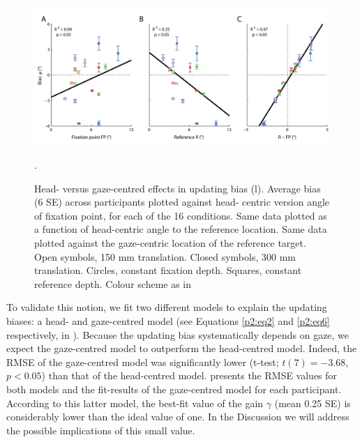 \begin{figure}
    \includegraphics[width=1.0\textwidth]{src/paper2/figure4.pdf}

    \caption{Head- versus gaze-centred effects in updating bias (l).  Average bias (6 SE) across participants plotted against head- centric version angle of fixation point, for each of the 16 conditions.  Same data plotted as a function of head-centric angle to the reference location.  Same data plotted against the gaze-centric location of the reference target. Open symbols, 150 mm translation. Closed symbols, 300 mm translation. Circles, constant fixation depth. Squares, constant reference depth. Colour scheme as in }.

    \label{p2:fig4}
\end{figure}

To validate this notion, we fit two different models to explain the updating biases: a head- and gaze-centred model (see Equations \ref{p2:eq2} and \ref{p2:eq6} respectively, in ). Because the updating bias systematically depends on gaze, we expect the gaze-centred model to outperform the head-centred model. Indeed, the RMSE of the gaze-centred model was significantly lower (t-test; $t(7) = -3.68$, $p < 0.05$) than that of the head-centred model.  presents the RMSE values for both models and the fit-results of the gaze-centred model for each participant. According to this latter model, the best-fit value of the gain $\gamma$ (mean 0.25  SE) is considerably lower than the ideal value of one. In the Discussion we will address the possible implications of this small value.

